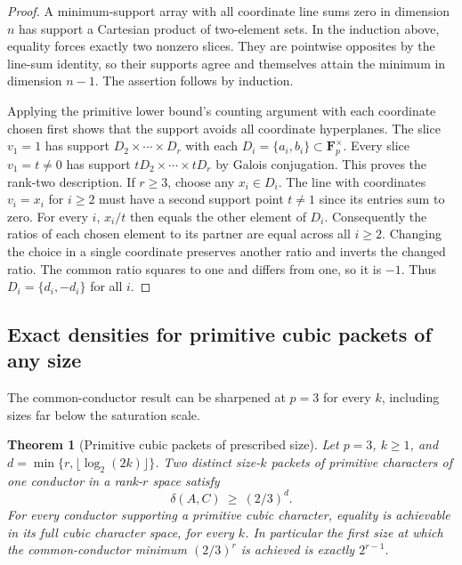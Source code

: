 \documentclass[11pt,letterpaper]{article}
\newcommand{\Fp}{\mathbf F_p}
\newtheorem{theorem}{Theorem}[section]
\theoremstyle{remark}
\begin{document}
\begin{proof}
A minimum-support array with all coordinate line sums zero in dimension
$n$ has support a Cartesian product of two-element sets. In the induction
above, equality forces exactly two nonzero slices. They are pointwise
opposites by the line-sum identity, so their supports agree and themselves
attain the minimum in dimension $n-1$. The assertion follows by induction.

Applying the primitive lower bound's counting argument with each coordinate
chosen first shows that the support avoids all coordinate hyperplanes.
The slice $v_1=1$ has support $D_2\times\cdots\times D_r$ with
each $D_i=\{a_i,b_i\}\subset\Fp^\times$. Every slice $v_1=t\ne0$
has support $tD_2\times\cdots\times tD_r$ by Galois conjugation. This
proves the rank-two description. If $r\ge3$, choose any $x_i\in D_i$.
The line with coordinates $v_i=x_i$ for $i\ge2$ must have a second
support point $t\ne1$ since its entries sum to zero. For every $i$,
$x_i/t$ then equals the other element of $D_i$. Consequently the ratios
of each chosen element to its partner are equal across all $i\ge2$.
Changing the choice in a single coordinate preserves another ratio and
inverts the changed ratio. The common ratio squares to one and differs
from one, so it is $-1$. Thus $D_i=\{d_i,-d_i\}$ for all $i$.
\end{proof}
\subsection{Exact densities for primitive cubic packets of any size}

The common-conductor result can be sharpened at $p=3$ for every $k$,
including sizes far below the saturation scale.

\begin{theorem}[Primitive cubic packets of prescribed size]\label{thm:cubic}
Let $p=3$, $k\ge1$, and $d=\min\{r,\lfloor\log_2(2k)\rfloor\}$.
Two distinct size-$k$ packets of primitive characters of one conductor
in a rank-$r$ space satisfy
\[
                  \delta(A,C)\ \ge\ (2/3)^d .
\]
For every conductor supporting a primitive cubic character, equality
is achievable in its full cubic character space, for every $k$.
In particular the first size at which the common-conductor minimum
$(2/3)^r$ is achieved is exactly $2^{r-1}$.
\end{theorem}
\end{document}
